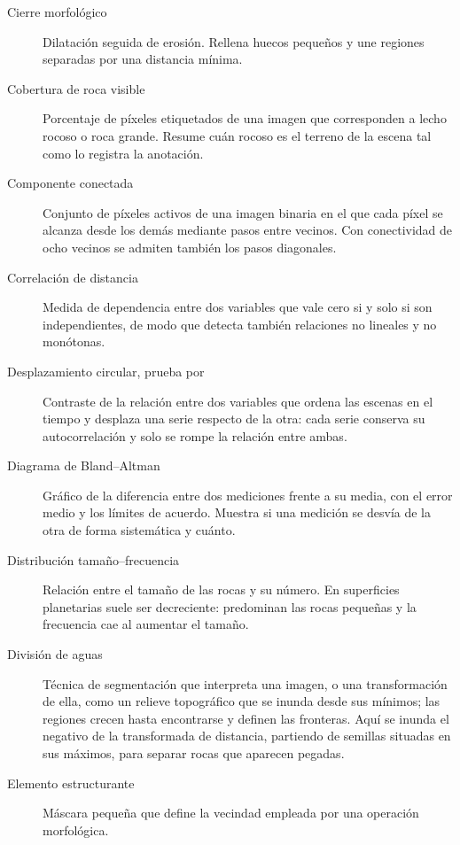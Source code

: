 {\begin{description}
  \item[Cierre morfológico] Dilatación seguida de erosión. Rellena huecos pequeños
    y une regiones separadas por una distancia mínima.

  \item[Cobertura de roca visible] Porcentaje de píxeles etiquetados de una imagen
    que corresponden a lecho rocoso o roca grande. Resume cuán rocoso es el terreno
    de la escena tal como lo registra la anotación.

  \item[Componente conectada] Conjunto de píxeles activos de una imagen binaria en
    el que cada píxel se alcanza desde los demás mediante pasos entre vecinos.
    Con conectividad de ocho vecinos se admiten también los pasos diagonales.

  \item[Correlación de distancia] Medida de dependencia entre dos variables que vale
    cero si y solo si son independientes, de modo que detecta también relaciones no
    lineales y no monótonas.

  \item[Desplazamiento circular, prueba por] Contraste de la relación entre dos
    variables que ordena las escenas en el tiempo y desplaza una serie respecto de
    la otra: cada serie conserva su autocorrelación y solo se rompe la relación
    entre ambas.

  \item[Diagrama de Bland--Altman] Gráfico de la diferencia entre dos mediciones
    frente a su media, con el error medio y los límites de acuerdo. Muestra si una
    medición se desvía de la otra de forma sistemática y cuánto.

  \item[Distribución tamaño--frecuencia] Relación entre el tamaño de las rocas y su
    número. En superficies planetarias suele ser decreciente: predominan las rocas
    pequeñas y la frecuencia cae al aumentar el tamaño.

  \item[División de aguas] Técnica de segmentación que interpreta una imagen, o una
    transformación de ella, como un relieve topográfico que se inunda desde sus
    mínimos; las regiones crecen hasta encontrarse y definen las fronteras. Aquí se
    inunda el negativo de la transformada de distancia, partiendo de semillas
    situadas en sus máximos, para separar rocas que aparecen pegadas.

  \item[Elemento estructurante] Máscara pequeña que define la vecindad empleada por
    una operación morfológica.


\end{description}}
